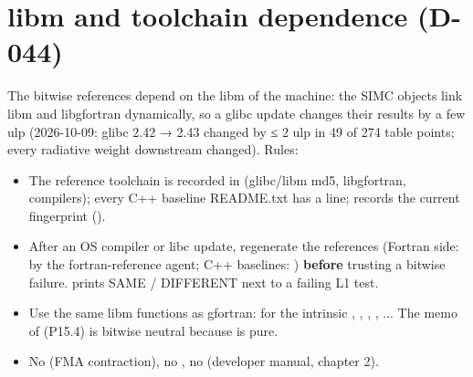 \section{\texorpdfstring{libm and toolchain dependence (D-044)}{libm and toolchain dependence (D-044)}}\label{translation_report-04u5fnumerics:45-libm-and-toolchain-dependence-d-044}
The bitwise references depend on the libm of the machine: the SIMC objects link libm and libgfortran dynamically,\allowbreak{} so a
glibc update changes their results by a few ulp (2026-10-09: glibc 2.42 → 2.43 changed  by ≤ 2 ulp in 49 of 274
table points; every radiative weight downstream changed). Rules:

\begin{itemize}
\item The reference toolchain is recorded in  (glibc/libm md5, libgfortran,\allowbreak{} compilers); every C++
baseline README.txt has a  line;  records the current fingerprint
().
\item After an OS compiler or libc update, regenerate the references (Fortran side: 
by the fortran-reference agent; C++ baselines: ) \textbf{before} trusting a bitwise
failure.  prints SAME / DIFFERENT next to a failing L1 test.
\item Use the same libm functions as gfortran:  for the intrinsic , , , ,
... The  memo of  (P15.4) is bitwise neutral because  is pure.
\item No  (FMA contraction),\allowbreak{} no , no  (developer manual, chapter 2).
\end{itemize}
